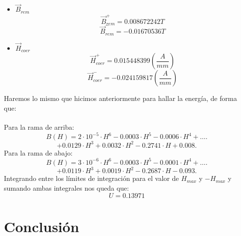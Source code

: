 \documentclass[11pt,letterpaper,twocolumn]{article}
\begin{document}
\begin{itemize}
	\item \textbf{$\vec{B}_{rem}$}
\begin{equation}	
	\boxed{\vec{B}^+_{rem}=0.008672242 T}
\end{equation}
\begin{equation}
	\boxed{\vec{B}^-_{rem}=-0.01670536 T}
\end{equation}

\item $\vec{H}_{coer}$
	 \begin{equation}
		 \boxed{\vec{H}^+_{coer}=0.015448399 \left( \frac{A}{mm} \right) }
	 \end{equation}
	 \begin{equation}
		 \boxed{\vec{H}^-_{coer}=-0.024159817 \left( \frac{A}{mm} \right) }
	 \end{equation}
\end{itemize}
Haremos lo mismo que hicimos anteriormente para hallar la energía, de forma que:\\
\\
Para la rama de arriba:
\[
B(H)=2\cdot 10^{-5}\cdot H^6  - 0.0003\cdot H^5 - 0.0006\cdot H^4 + \ldots .
\]
\[
	+ 0.0129\cdot H^3 +0.0032\cdot H^2-0.2741\cdot H+0.008
.\] 
Para la rama de abajo:
\[
	B(H)=3\cdot 10^{-6}\cdot H^6 - 0.0003\cdot H^5 - 0.0001\cdot H^4+ \ldots	
.\] 
\[
	+ 0.0119\cdot H^3 +0.0019\cdot H^2-0.2687\cdot H- 0.093
.\] 
Integrando entre los límites de integración para el valor de $H_{max}$ y  $-H_{max}$ y sumando ambas integrales nos queda que:
\begin{equation}
	\boxed{U=0.13971}
\end{equation}
\section{Conclusión}%
\label{secas}
\end{document}
